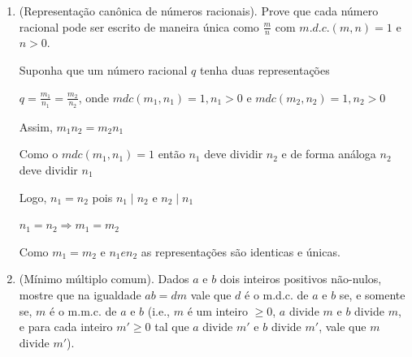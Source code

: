 \begin{enumerate}[label=3.\arabic*.]
    $m.d.c.(ma,mb,\ldots,mc) = m \cdot m.d.c.(a,b,\ldots,c)$.
    
    Seja $mdc(a,b,\ldots,c) = ax + by + \ldots + cz$
    
    Neste caso,

    $mdc(ma,mb,\ldots,mc) = max + mby + \ldots + mcz$
    
    $= m \cdot (ax + by + \ldots cz)$
    
    $= m \cdot mdc(a,b,\ldots,c)$      

    \item (Representação canônica de números racionais). Prove que cada número racional 
    pode ser escrito de maneira única como $\frac{m}{n}$ com $m.d.c.(m,n) = 1$ e $n>0$.

    Suponha que um número racional $q$ tenha duas representações

    $q = \frac{m_1}{n_1} = \frac{m_2}{n_2}$, onde $mdc(m_1,n_1) = 1, n_1 > 0$ e $mdc(m_2,n_2) = 1, n_2 > 0$

    Assim, $m_1n_2 = m_2n_1$

    Como o $mdc(m_1,n_1) = 1$ então $n_1$ deve dividir $n_2$ e de forma análoga $n_2$ deve dividir $n_1$

    Logo, $n_1 = n_2$ pois $n_1 \mid n_2$ e $n_2 \mid n_1$
    
    $n_1 = n_2 \Rightarrow m_1 = m_2$

    Como $m_1 = m_2$ e $n_1 e n_2$ as representações são identicas e únicas. 

    \item (Mínimo múltiplo comum). Dados $a$ e $b$ dois inteiros positivos não-nulos, mostre 
    que na igualdade $ab = d m$ vale que $d$ é o m.d.c. de $a$ e $b$ se, e somente se, $m$ é o 
    m.m.c. de $a$ e $b$ (i.e., $m$ é um inteiro $\geq 0$, $a$ divide $m$ e $b$ divide $m$, e para cada 
    inteiro $m' \geq 0$ tal que $a$ divide $m'$ e $b$ divide $m'$, vale que $m$ divide $m'$).

\end{enumerate}
